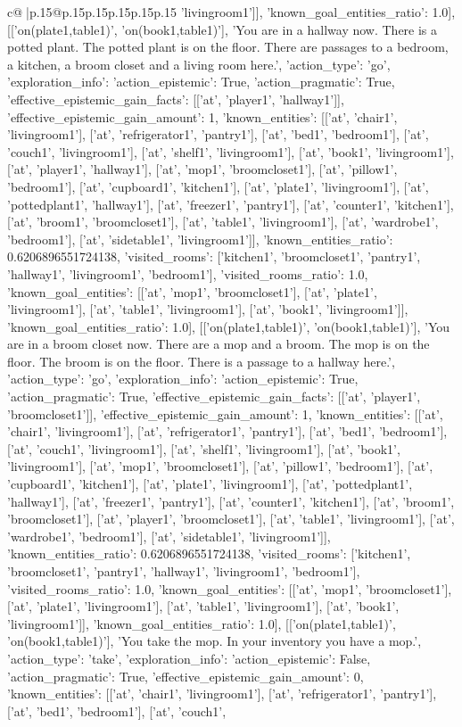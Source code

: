 \documentclass{article}
\begin{document}
{\begin{supertabular}{c@{$\;$}|p{.15\linewidth}@{}p{.15\linewidth}p{.15\linewidth}p{.15\linewidth}p{.15\linewidth}p{.15\linewidth}}
{{{'livingroom1']], 'known_goal_entities_ratio': 1.0}}], [['on(plate1,table1)', 'on(book1,table1)'], 'You are in a hallway now. There is a potted plant. The potted plant is on the floor. There are passages to a bedroom, a kitchen, a broom closet and a living room here.', {'action_type': 'go', 'exploration_info': {'action_epistemic': True, 'action_pragmatic': True, 'effective_epistemic_gain_facts': [['at', 'player1', 'hallway1']], 'effective_epistemic_gain_amount': 1, 'known_entities': [['at', 'chair1', 'livingroom1'], ['at', 'refrigerator1', 'pantry1'], ['at', 'bed1', 'bedroom1'], ['at', 'couch1', 'livingroom1'], ['at', 'shelf1', 'livingroom1'], ['at', 'book1', 'livingroom1'], ['at', 'player1', 'hallway1'], ['at', 'mop1', 'broomcloset1'], ['at', 'pillow1', 'bedroom1'], ['at', 'cupboard1', 'kitchen1'], ['at', 'plate1', 'livingroom1'], ['at', 'pottedplant1', 'hallway1'], ['at', 'freezer1', 'pantry1'], ['at', 'counter1', 'kitchen1'], ['at', 'broom1', 'broomcloset1'], ['at', 'table1', 'livingroom1'], ['at', 'wardrobe1', 'bedroom1'], ['at', 'sidetable1', 'livingroom1']], 'known_entities_ratio': 0.6206896551724138, 'visited_rooms': ['kitchen1', 'broomcloset1', 'pantry1', 'hallway1', 'livingroom1', 'bedroom1'], 'visited_rooms_ratio': 1.0, 'known_goal_entities': [['at', 'mop1', 'broomcloset1'], ['at', 'plate1', 'livingroom1'], ['at', 'table1', 'livingroom1'], ['at', 'book1', 'livingroom1']], 'known_goal_entities_ratio': 1.0}}], [['on(plate1,table1)', 'on(book1,table1)'], 'You are in a broom closet now. There are a mop and a broom. The mop is on the floor. The broom is on the floor. There is a passage to a hallway here.', {'action_type': 'go', 'exploration_info': {'action_epistemic': True, 'action_pragmatic': True, 'effective_epistemic_gain_facts': [['at', 'player1', 'broomcloset1']], 'effective_epistemic_gain_amount': 1, 'known_entities': [['at', 'chair1', 'livingroom1'], ['at', 'refrigerator1', 'pantry1'], ['at', 'bed1', 'bedroom1'], ['at', 'couch1', 'livingroom1'], ['at', 'shelf1', 'livingroom1'], ['at', 'book1', 'livingroom1'], ['at', 'mop1', 'broomcloset1'], ['at', 'pillow1', 'bedroom1'], ['at', 'cupboard1', 'kitchen1'], ['at', 'plate1', 'livingroom1'], ['at', 'pottedplant1', 'hallway1'], ['at', 'freezer1', 'pantry1'], ['at', 'counter1', 'kitchen1'], ['at', 'broom1', 'broomcloset1'], ['at', 'player1', 'broomcloset1'], ['at', 'table1', 'livingroom1'], ['at', 'wardrobe1', 'bedroom1'], ['at', 'sidetable1', 'livingroom1']], 'known_entities_ratio': 0.6206896551724138, 'visited_rooms': ['kitchen1', 'broomcloset1', 'pantry1', 'hallway1', 'livingroom1', 'bedroom1'], 'visited_rooms_ratio': 1.0, 'known_goal_entities': [['at', 'mop1', 'broomcloset1'], ['at', 'plate1', 'livingroom1'], ['at', 'table1', 'livingroom1'], ['at', 'book1', 'livingroom1']], 'known_goal_entities_ratio': 1.0}}], [['on(plate1,table1)', 'on(book1,table1)'], 'You take the mop. In your inventory you have a mop.', {'action_type': 'take', 'exploration_info': {'action_epistemic': False, 'action_pragmatic': True, 'effective_epistemic_gain_amount': 0, 'known_entities': [['at', 'chair1', 'livingroom1'], ['at', 'refrigerator1', 'pantry1'], ['at', 'bed1', 'bedroom1'], ['at', 'couch1', }}}
\end{supertabular}}
\end{document}
